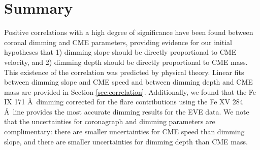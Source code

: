 \section{Summary} 
\label{sec:chapter5summary}
Positive correlations with a high degree of significance have been found between coronal dimming and CME parameters, providing evidence for our initial hypotheses that 1) dimming slope should be directly proportional to CME velocity, and 2) dimming depth should be directly proportional to CME mass. This existence of the correlation was predicted by physical theory. Linear fits between dimming slope and CME speed and between dimming depth and CME mass are provided in Section \ref{sec:correlation}. Additionally, we found that the Fe IX 171 \AA\ dimming corrected for the flare contributions using the Fe XV 284 \AA\ line provides the most accurate dimming results for the EVE data. We note that the uncertainties for coronagraph and dimming parameters are complimentary: there are smaller uncertainties for CME speed than dimming slope, and there are smaller uncertainties for dimming depth than CME mass.